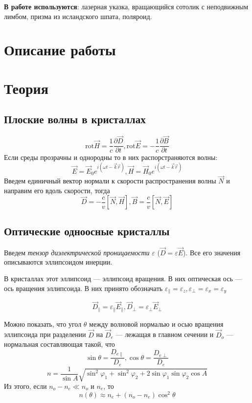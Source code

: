 \textbf{В работе используются}: лазерная указка, вращающийся сотолик с неподвижным лимбом, призма из исландского шпата, поляроид.
\section{Описание работы}

\section{Теория}
\subsection{Плоские волны в кристаллах}
\begin{equation}
\text{rot} \vec{H} = \dfrac{1}{c}\dfrac{\partial \vec{D}}{\partial t}, \text{rot} \vec{E} = -\dfrac{1}{c}\dfrac{\partial \vec{B}}{\partial t}
\end{equation}
Если среды прозрачны и однородны то в них распорстраняются волны:
\begin{equation}
\vec E = \vec{E}_0 e^{i(\omega t - \vec{k}\vec{r})}, \vec{H} = \vec{H}_0e^{i(\omega t - \vec{k}\vec{r})}
\end{equation}
Введем единичный вектор нормали к скорости распространения волны $\vec{N}$ и направим его вдоль скорости, тогда
\begin{equation}
\vec{D} = -\dfrac{c}{v}\left[\vec{N}, \vec{H}\right], \vec{B} = \dfrac{c}{v}\left[  \vec{N}, \vec{E}\right]
\end{equation}
\subsection{Оптические одноосные кристаллы}
Введем \textit{тензор диэлектрической проницаемости} $\varepsilon$ ($\vec{D} = \varepsilon \vec{E}$). Все его значения описываются эллипсоидом инерции. 

В кристаллах этот эллипсоид --- эллипсоид вращения. В них оптическая ось --- ось вращения эллипсоида. В них принято обозначать $\varepsilon_{\parallel} = \varepsilon_z, \varepsilon_{\perp} = \varepsilon_x = \varepsilon_y$

\begin{equation}
\vec{D}_{\parallel} = \varepsilon_{\parallel} \vec{E}_{\parallel},\vec{D}_{\perp} = \varepsilon_{\perp} \vec{E}_{\perp} 
\end{equation}

Можно показать, что угол $\theta$ между волновой нормалью и осью вращения эллипсоида при разделении $\vec{D}$ на $\vec{D}_e$ --- лежащая в главном сечении и $\vec{D}_o$ --- нормальная составляющая такой, что
\begin{equation}
\sin \theta = \dfrac{D_{e\parallel}}{D_e}, \cos \theta = \dfrac{D_{e\perp}}{D_e}
\end{equation}
\begin{equation}
n = \dfrac{1}{\sin A}\sqrt{\sin^2 \varphi_1 + \sin^2 \varphi_2 + 2 \sin \varphi_1 \sin \varphi_2 \cos A}
\end{equation}
Из этого, если $n_o - n_e \ll n_o$ и $n_e$, то 
\begin{equation}
n(\theta) \approx n_e + (n_o - n_e) \cos^2 \theta
\end{equation}
